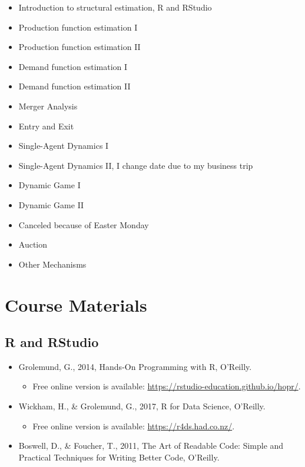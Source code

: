 \documentclass[]{book}
\providecommand{\tightlist}{%
  \setlength{\itemsep}{0pt}\setlength{\parskip}{0pt}}
\theoremstyle{definition}
\theoremstyle{definition}
\theoremstyle{definition}
\theoremstyle{remark}
\begin{document}
\begin{itemize}
\tightlist
\item
  Introduction to structural estimation, R and RStudio
\item
  Production function estimation I
\item
  Production function estimation II
\item
  Demand function estimation I
\item
  Demand function estimation II
\item
  Merger Analysis
\item
  Entry and Exit
\item
  Single-Agent Dynamics I
\item
  Single-Agent Dynamics II, I change date due to my business trip
\item
  Dynamic Game I
\item
  Dynamic Game II
\item
  Canceled because of Easter Monday
\item
  Auction
\item
  Other Mechanisms
\end{itemize}

\section{Course Materials}\label{course-materials}

\subsection{R and RStudio}\label{r-and-rstudio}

\begin{itemize}
\tightlist
\item
  Grolemund, G., 2014, Hands-On Programming with R, O'Reilly.

  \begin{itemize}
  \tightlist
  \item
    Free online version is available:
    \url{https://rstudio-education.github.io/hopr/}.
  \end{itemize}
\item
  Wickham, H., \& Grolemund, G., 2017, R for Data Science, O'Reilly.

  \begin{itemize}
  \tightlist
  \item
    Free online version is available: \url{https://r4ds.had.co.nz/}.
  \end{itemize}
\item
  Boswell, D., \& Foucher, T., 2011, The Art of Readable Code: Simple
  and Practical Techniques for Writing Better Code, O'Reilly.
\end{itemize}
\end{document}
